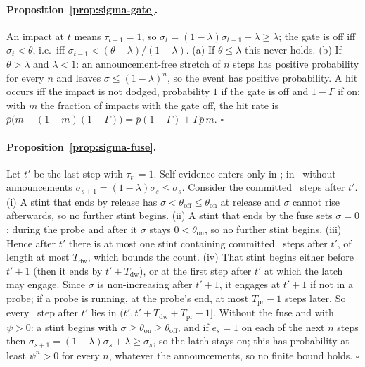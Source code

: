\paragraph{Proposition~\ref{prop:sigma-gate}.}
An impact at $t$ means $\tau_{t-1}=1$, so $\sigma_t=(1-\lambda)\sigma_{t-1}+\lambda\ge\lambda$; the gate is off iff $\sigma_t<\theta$, i.e.\ iff $\sigma_{t-1}<(\theta-\lambda)/(1-\lambda)$. (a) If $\theta\le\lambda$ this never holds. (b) If $\theta>\lambda$ and $\lambda<1$: an announcement-free stretch of $n$ steps has positive probability for every $n$ and leaves $\sigma\le(1-\lambda)^n$, so the event has positive probability. A hit occurs iff the impact is not dodged, probability $1$ if the gate is off and $1-\Gamma$ if on; with $m$ the fraction of impacts with the gate off, the hit rate is $\bar p\bigl(m+(1-m)(1-\Gamma)\bigr)=\bar p(1-\Gamma)+\Gamma\bar p\,m$. \hfill$\square$

\paragraph{Proposition~\ref{prop:sigma-fuse}.}
Let $t'$ be the last step with $\tau_{t'}=1$. Self-evidence enters only in \GUARD; in \WORK\ without announcements $\sigma_{s+1}=(1-\lambda)\sigma_s\le\sigma_s$. Consider the committed \GUARD\ steps after $t'$. (i) A stint that ends by release has $\sigma<\theta_{\mathrm{off}}\le\theta_{\mathrm{on}}$ at release and $\sigma$ cannot rise afterwards, so no further stint begins. (ii) A stint that ends by the fuse sets $\sigma=0$; during the probe and after it $\sigma$ stays $0<\theta_{\mathrm{on}}$, so no further stint begins. (iii) Hence after $t'$ there is at most one stint containing committed \GUARD\ steps after $t'$, of length at most $T_{\mathrm{dw}}$, which bounds the count. (iv) That stint begins either before $t'+1$ (then it ends by $t'+T_{\mathrm{dw}}$), or at the first step after $t'$ at which the latch may engage. Since $\sigma$ is non-increasing after $t'+1$, it engages at $t'+1$ if not in a probe; if a probe is running, at the probe's end, at most $T_{\mathrm{pr}}-1$ steps later. So every \GUARD\ step after $t'$ lies in $(t',t'+T_{\mathrm{dw}}+T_{\mathrm{pr}}-1]$. Without the fuse and with $\psi>0$: a stint begins with $\sigma\ge\theta_{\mathrm{on}}\ge\theta_{\mathrm{off}}$, and if $e_s=1$ on each of the next $n$ steps then $\sigma_{s+1}=(1-\lambda)\sigma_s+\lambda\ge\sigma_s$, so the latch stays on; this has probability at least $\psi^n>0$ for every $n$, whatever the announcements, so no finite bound holds. \hfill$\square$


